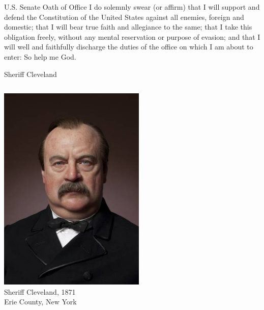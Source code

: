 \documentclass{beamer}
\begin{document}
\begin{frame}
    \begin{block}{U.S. Senate Oath of Office}
    I do solemnly swear (or affirm) that I will support and defend the Constitution of the United States against all enemies, foreign and domestic; that I will bear true faith and allegiance to the same; that I take this obligation freely, without any mental reservation or purpose of evasion; and that I will well and faithfully discharge the duties of the office on which I am about to enter: So help me God.
    \end{block}
\end{frame}

\begin{frame}{Sheriff Cleveland}
    \begin{columns}[onlytextwidth]
            \centering
            \includegraphics[width=0.75\textwidth]{img/cleveland.png} \\

            \centering
            Sheriff Cleveland, 1871 \\
            Erie County, New York
    \end{columns}
\end{frame}
\end{document}
